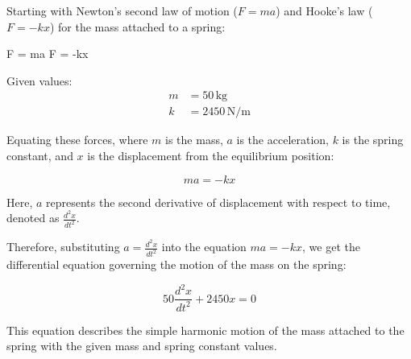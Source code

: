 \documentclass[journal,12pt,twocolumn]{IEEEtran}
\theoremstyle{remark}
\begin{document}
	\vspace{2cm}

	Starting with Newton's second law of motion ($F = ma$) and Hooke's law ($F = -kx$) for the mass attached to a spring:


     F = ma \quad {} \quad {} F = -kx


Given values:
\begin{align*}
    m &= 50 \, \text{kg} \\
    k &= 2450 \, \text{N/m}
\end{align*}

Equating these forces, where $m$ is the mass, $a$ is the acceleration, $k$ is the spring constant, and $x$ is the displacement from the equilibrium position:

\begin{equation}
    ma = -kx
\end{equation}

Here, $a$ represents the second derivative of displacement with respect to time, denoted as $\frac{d^2x}{dt^2}$.

Therefore, substituting $a = \frac{d^2x}{dt^2}$ into the equation $ma = -kx$, we get the differential equation governing the motion of the mass on the spring:

\begin{equation}
    50 \frac{d^2x}{dt^2} + 2450x = 0
\end{equation}

This equation describes the simple harmonic motion of the mass attached to the spring with the given mass and spring constant values.	
\end{document}
